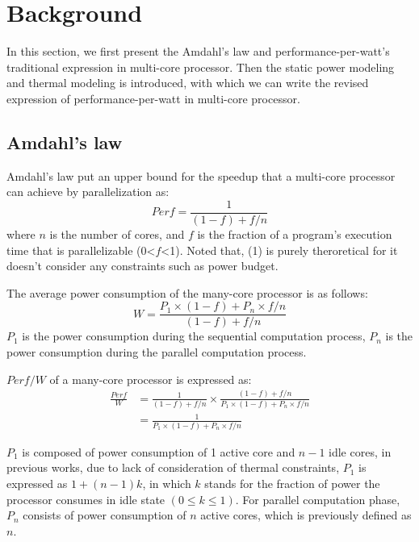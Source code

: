 \section{Background}
In this section, we first present the Amdahl's law and performance-per-watt's traditional expression in multi-core processor. Then the static power modeling and thermal modeling is introduced, with which we can write the revised expression of performance-per-watt in multi-core processor.

\subsection{Amdahl's law}
Amdahl's law put an upper bound for the speedup that a multi-core processor can achieve by parallelization as:
\begin{equation}\label{speedup}
Perf = \frac{1} {(1-f)+f/n}
\end{equation}
where $n$ is the number of cores, and $f$ is the fraction of a program's execution time that is parallelizable (0<$f$<1). Noted that, (1) is purely theroretical for it doesn't consider any constraints such as power budget.

The average power consumption of the many-core processor is as follows:
\begin{equation}\label{average_power}
W = \frac{P_{1} \times (1-f)+P_{n} \times f/n}{(1-f)+f/n}
\end{equation}
$P_{1}$ is the power consumption during the sequential computation process, $P_{n}$ is the power consumption during the parallel computation process.

$Perf/W$ of a many-core processor is expressed as:
\begin{equation}\label{ppw}
\begin{split}
\frac{Perf}{W} &= \frac{1}{(1-f)+f/n} \times \frac{(1-f)+f/n}{P_{1} \times (1-f)+P_{n} \times f/n}\\
&= \frac{1}{P_{1} \times (1-f)+P_{n} \times f/n}
\end{split}
\end{equation}

$P_{1}$ is composed of power consumption of 1 active core and $n-1$ idle cores, in previous works, due to lack of consideration of thermal constraints, $P_{1}$ is expressed as $1+(n-1)k$, in which $k$ stands for the fraction of power the processor consumes in idle state $(0 \le k \le 1)$. For parallel computation phase, $P_{n}$ consists of power consumption of $n$ active cores, which is previously defined as $n$.

